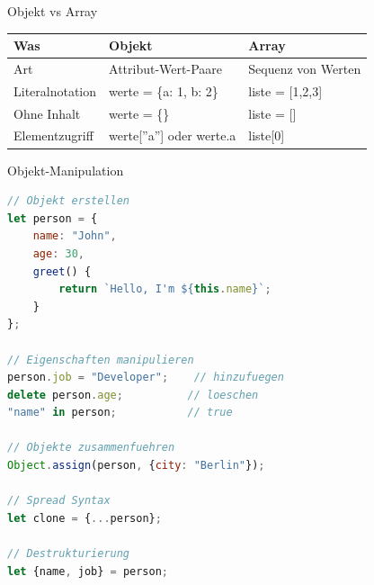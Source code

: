 \begin{theorem}{Objekt vs Array}\\
    \begin{tabular}{|l|l|l|}
        \hline
        Was & Objekt & Array \\
        \hline
        Art & Attribut-Wert-Paare & Sequenz von Werten \\
        \hline
        Literalnotation & werte = \{a: 1, b: 2\} & liste = [1,2,3] \\
        \hline
        Ohne Inhalt & werte = \{\} & liste = [] \\
        \hline
        Elementzugriff & werte[''a''] oder werte.a & liste[0] \\
        \hline
    \end{tabular}
\end{theorem}

\begin{KR}{Objekt-Manipulation}
\begin{lstlisting}[language=JavaScript, style=basesmol]
// Objekt erstellen
let person = {
    name: "John",
    age: 30,
    greet() {
        return `Hello, I'm ${this.name}`;
    }
};

// Eigenschaften manipulieren
person.job = "Developer";    // hinzufuegen
delete person.age;          // loeschen
"name" in person;           // true

// Objekte zusammenfuehren
Object.assign(person, {city: "Berlin"});

// Spread Syntax
let clone = {...person};

// Destrukturierung
let {name, job} = person;
\end{lstlisting}
\end{KR}

